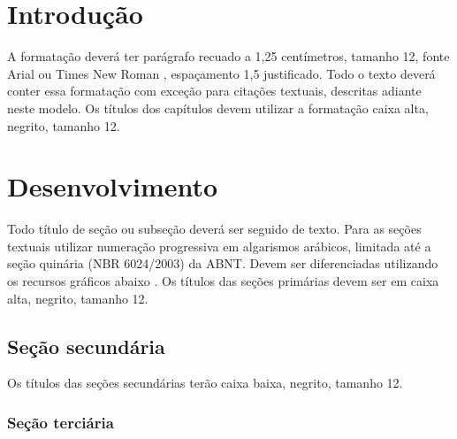 \section{\esp Introdução}


A formatação deverá ter parágrafo recuado a 1,25 centímetros, tamanho 12, fonte Arial ou Times New Roman , espaçamento 1,5 justificado. Todo o texto deverá conter essa formatação com exceção para citações textuais, 
descritas adiante neste modelo. Os títulos dos capítulos devem utilizar a formatação caixa alta, negrito, tamanho 12.

\section{\esp Desenvolvimento}

Todo título de seção ou subseção deverá ser seguido de texto.
Para as seções textuais utilizar numeração progressiva em algarismos arábicos, limitada até a seção quinária 
(NBR 6024/2003) da ABNT. Devem ser diferenciadas utilizando os recursos gráficos abaixo \cite{manualpuc}.
Os títulos das seções primárias devem ser em caixa alta, negrito, tamanho 12.

\subsection{\esp Seção secundária}

Os títulos das seções secundárias terão caixa baixa, negrito, tamanho 12.

\subsubsection{\esp Seção terciária}

